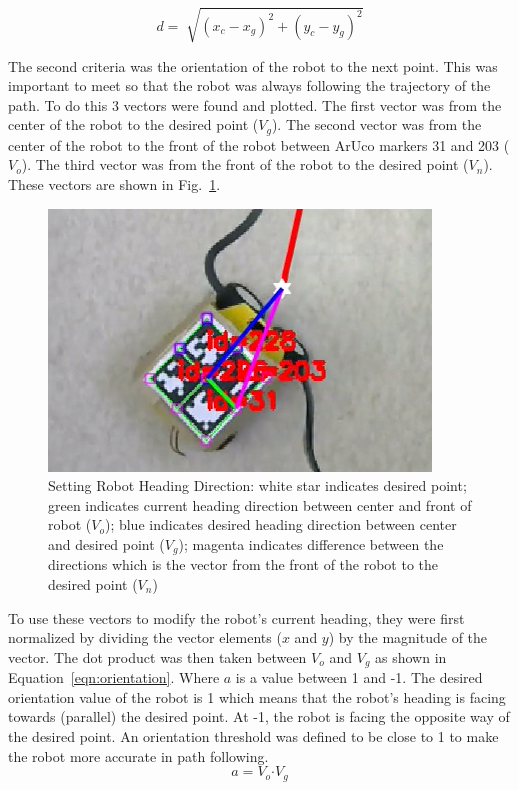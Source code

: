 \documentclass[12pt,american]{report}
\begin{document}
\begin{equation}
d = \sqrt[]{(x_c - x_g)^2 + (y_c - y_g)^2}
\label{eqn:distance}
\end{equation}

The second criteria was the orientation of the robot to the next point. This was important to meet so that the robot was always following the trajectory of the path. To do this 3 vectors were found and plotted. The first vector was from the center of the robot to the desired point ($V_g$). The second vector was from the center of the robot to the front of the robot between ArUco markers 31 and 203 ($V_o$). The third vector was from the front of the robot to the desired point ($V_n$). These vectors are shown in Fig.~\ref{fig:orientation}.

\begin{figure}[h!]
\centering
\includegraphics[scale=1]{images/angle.PNG}
\caption{Setting Robot Heading Direction: white star indicates desired point; green indicates current heading direction between center and front of robot ($V_o$); blue indicates desired heading direction between center and desired point ($V_g$); magenta indicates difference between the directions which is the vector from the front of the robot to the desired point ($V_n$)}
\label{fig:orientation}
\end{figure}

To use these vectors to modify the robot's current heading, they were first normalized by dividing the vector elements ($x$ and $y$) by the magnitude of the vector. The dot product was then taken between $V_o$ and $V_g$ as shown in Equation~\ref{eqn:orientation}. Where $a$ is a value between 1 and -1. The desired orientation value of the robot is 1 which means that the robot's heading is facing towards (parallel) the desired point.  At -1, the robot is facing the opposite way of the desired point. An orientation threshold was defined to be close to 1 to make the robot more accurate in path following.
\begin{equation}
a = V_o  \bm{\cdot} V_g
\label{eqn:orientation}
\end{equation}
\end{document}
